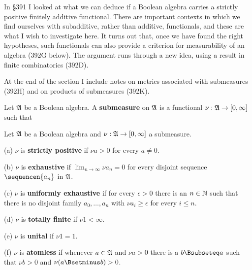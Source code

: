 
\def\chaptername{Measurable algebras}
\def\sectionname{Submeasures}


In \S391 I looked at what we can deduce if a Boolean algebra carries a
strictly positive finitely additive functional.   There are important
contexts in which we find ourselves with subadditive, rather than
additive, functionals, and these are what I wish to investigate here.
It turns out that, once we have found the right hypotheses, such
functionals can also provide a criterion for measurability of an algebra
(392G below).   The argument runs through a new idea, using a result in
finite combinatorics (392D).

At the end of the section I include notes on metrics associated with
submeasures (392H) and on products of submeasures (392K).

Let $\frak A$ be a Boolean algebra.   A
{\bf submeasure} on $\frak A$ is a functional
$\nu:\frak A\to[0,\infty]$ such that


 Let $\frak A$ be a Boolean algebra and
$\nu:\frak A\to[0,\infty]$ a submeasure.

(a) $\nu$ is {\bf strictly positive} if $\nu a>0$ for every $a\ne 0$.

(b) $\nu$ is {\bf exhaustive} if $\lim_{n\to\infty}\nu a_n=0$ for every
disjoint sequence $\sequencen{a_n}$ in $\frak A$.

(c) $\nu$ is {\bf uniformly exhaustive} if for every $\epsilon>0$ there
is an $n\in\Bbb N$ such that there is no disjoint family
$a_0,\ldots,a_n$ with $\nu a_i\ge\epsilon$ for every $i\le n$.

(d) $\nu$ is {\bf totally finite} if $\nu 1<\infty$.

(e) $\nu$ is {\bf unital} if $\nu 1=1$.

(f) $\nu$ is {\bf atomless} if whenever $a\in\frak A$ and $\nu a>0$ there
is a $b\Bsubseteq a$ such that $\nu b>0$ and $\nu(a\Bsetminus b)>0$.

